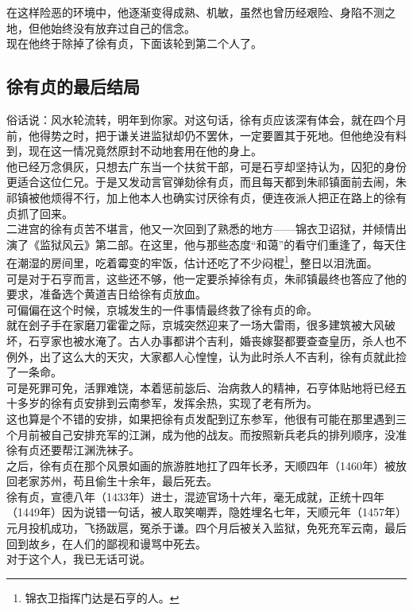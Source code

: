 \begin{multicols}{\theparacolNo}
在这样险恶的环境中，他逐渐变得成熟、机敏，虽然也曾历经艰险、身陷不测之地，但他始终没有放弃过自己的信念。\\

现在他终于除掉了徐有贞，下面该轮到第二个人了。\\

\subsection{徐有贞的最后结局}
俗话说：风水轮流转，明年到你家。对这句话，徐有贞应该深有体会，就在四个月前，他得势之时，把于谦关进监狱却仍不罢休，一定要置其于死地。但他绝没有料到，现在这一情况竟然原封不动地套用在他的身上。\\

他已经万念俱灰，只想去广东当一个扶贫干部，可是石亨却坚持认为，囚犯的身份更适合这位仁兄。于是又发动言官弹劾徐有贞，而且每天都到朱祁镇面前去闹，朱祁镇被他烦得不行，加上他本人也确实讨厌徐有贞，便连夜派人把正在路上的徐有贞抓了回来。\\

二进宫的徐有贞苦不堪言，他又一次回到了熟悉的地方——锦衣卫诏狱，并倾情出演了《监狱风云》第二部。在这里，他与那些态度“和蔼”的看守们重逢了，每天住在潮湿的房间里，吃着霉变的牢饭，估计还吃了不少闷棍\footnote{锦衣卫指挥门达是石亨的人。}，整日以泪洗面。\\

可是对于石亨而言，这些还不够，他一定要杀掉徐有贞，朱祁镇最终也答应了他的要求，准备选个黄道吉日给徐有贞放血。\\

可偏偏在这个时候，京城发生的一件事情最终救了徐有贞的命。\\

就在刽子手在家磨刀霍霍之际，京城突然迎来了一场大雷雨，很多建筑被大风破坏，石亨家也被水淹了。古人办事都讲个吉利，婚丧嫁娶都要查查皇历，杀人也不例外，出了这么大的天灾，大家都人心惶惶，认为此时杀人不吉利，徐有贞就此捡了一条命。\\

可是死罪可免，活罪难饶，本着惩前毖后、治病救人的精神，石亨体贴地将已经五十多岁的徐有贞安排到云南参军，发挥余热，实现了老有所为。\\

这也算是个不错的安排，如果把徐有贞发配到辽东参军，他很有可能在那里遇到三个月前被自己安排充军的江渊，成为他的战友。而按照新兵老兵的排列顺序，没准徐有贞还要帮江渊洗袜子。\\

之后，徐有贞在那个风景如画的旅游胜地扛了四年长矛，天顺四年（1460年）被放回老家苏州，苟且偷生十余年，最后死去。\\

徐有贞，宣德八年（1433年）进士，混迹官场十六年，毫无成就，正统十四年（1449年）因为说错一句话，被人取笑嘲弄，隐姓埋名七年，天顺元年（1457年）元月投机成功，飞扬跋扈，冤杀于谦。四个月后被关入监狱，免死充军云南，最后回到故乡，在人们的鄙视和谩骂中死去。\\

对于这个人，我已无话可说。\\
\ifnum{}
	\end{multicols}
\fi
\newpage
